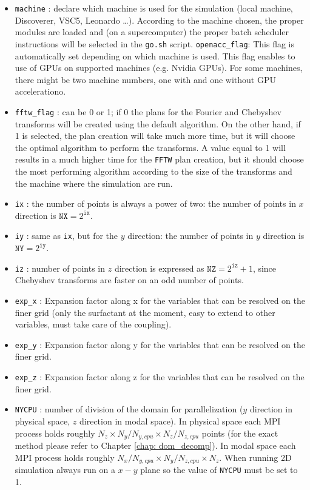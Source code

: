 \begin{itemize}
\item \texttt{machine} : declare which machine is used for the simulation (local machine, Discoverer, VSC5, Leonardo \dots). According to the machine chosen, the proper modules are loaded and (on a supercomputer) the proper batch scheduler instructions will be selected in the \texttt{go.sh} script.
\texttt{openacc\_flag}: This flag is automatically set depending on which machine is used. This flag enables to use of GPUs on supported machines (e.g. Nvidia GPUs). For some machines, there might be two machine numbers, one with and one without GPU accelerationo.
\item \texttt{fftw\_flag} : can be 0 or 1; if 0 the plans for the Fourier and Chebyshev transforms will be created using the default algorithm. On the other hand, if 1 is selected, the plan creation will take much more time, but it will choose the optimal algorithm to perform the transforms. A value equal to 1 will results in a much higher time for the \texttt{FFTW} plan creation, but it should choose the most performing algorithm according to the size of the transforms and the machine where the simulation are run.
\item \texttt{ix} : the number of points is always a power of two: the number of points in $x$ direction is $\texttt{NX}=2^\texttt{ix}$.
\item \texttt{iy} : same as \texttt{ix}, but for the $y$ direction: the number of points in $y$ direction is $\texttt{NY}=2^\texttt{iy}$.
\item \texttt{iz} : number of points in $z$ direction is expressed as $\texttt{NZ}=2^\texttt{iz}+1$, since Chebyshev transforms are faster on an odd number of points.
\item \texttt{exp\_x} : Expansion factor along x for the variables that can be resolved on the finer grid (only the surfactant at the moment, easy to extend to other variables, must take care of the coupling).
\item \texttt{exp\_y} : Expansion factor along y for the variables that can be resolved on the finer grid.
\item \texttt{exp\_z} : Expansion factor along z for the variables that can be resolved on the finer grid.
\item \texttt{NYCPU} : number of division of the domain for parallelization ($y$ direction in physical space, $z$ direction in modal space). In physical space each MPI process holds roughly $N_z\times N_y/N_{y,cpu} \times N_z/N_{z,cpu}$ points (for the exact method please refer to Chapter \ref{chap: dom_decomp}). In modal space each MPI process holds roughly $N_x/N_{y,cpu}\times N_y/N_{z,cpu}\times N_z$. When running 2D simulation always run on a $x-y$ plane so the value of \texttt{NYCPU} must be set to 1.

\end{itemize}
